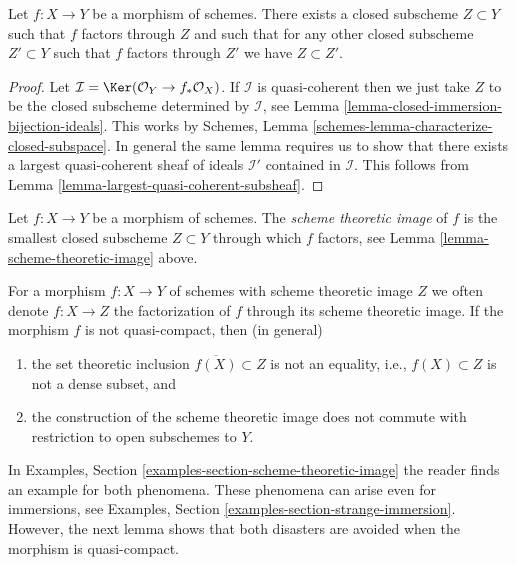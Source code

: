 \begin{lemma}
\label{lemma-scheme-theoretic-image}
Let $f : X \to Y$ be a morphism of schemes. There exists a closed
subscheme $Z \subset Y$ such that $f$ factors through $Z$ and such
that for any other closed subscheme $Z' \subset Y$ such that $f$
factors through $Z'$ we have $Z \subset Z'$.
\end{lemma}

\begin{proof}
Let $\mathcal{I} = \Ker(\mathcal{O}_Y \to f_*\mathcal{O}_X)$.
If $\mathcal{I}$ is quasi-coherent then we just take $Z$ to be the
closed subscheme determined by $\mathcal{I}$, see
Lemma \ref{lemma-closed-immersion-bijection-ideals}. This works by
Schemes, Lemma \ref{schemes-lemma-characterize-closed-subspace}.
In general the same lemma requires us to show that there exists
a largest quasi-coherent sheaf of ideals $\mathcal{I}'$ contained in
$\mathcal{I}$.
This follows from Lemma \ref{lemma-largest-quasi-coherent-subsheaf}.
\end{proof}

\begin{definition}
\label{definition-scheme-theoretic-image}
Let $f : X \to Y$ be a morphism of schemes. The {\it scheme theoretic image}
of $f$ is the smallest closed subscheme $Z \subset Y$ through which $f$
factors, see Lemma \ref{lemma-scheme-theoretic-image} above.
\end{definition}

\noindent
For a morphism $f : X \to Y$ of schemes with scheme theoretic image $Z$
we often denote $f : X \to Z$ the factorization of $f$
through its scheme theoretic image. If the morphism $f$ is not
quasi-compact, then (in general)
\begin{enumerate}
\item the set theoretic inclusion $\overline{f(X)} \subset Z$
is not an equality, i.e., $f(X) \subset Z$ is not a dense subset, and
\item the construction of the scheme theoretic image does not commute with
restriction to open subschemes to $Y$.
\end{enumerate}
In Examples, Section \ref{examples-section-scheme-theoretic-image}
the reader finds an example for both phenomena.
These phenomena can arise even for immersions, see
Examples, Section \ref{examples-section-strange-immersion}.
However, the next lemma shows that both disasters are avoided
when the morphism is quasi-compact.

